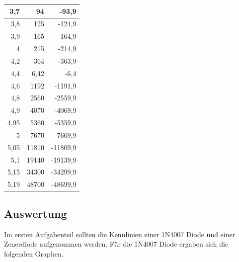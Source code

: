 \documentclass[12pt,a4paper]{article}
\begin{document}
\begin{table}[H]
\begin{center}
\begin{tabular}{|r|r|r|}
3,7 & 94 & -93,9 \\ \hline
3,8 & 125 & -124,9 \\ \hline
3,9 & 165 & -164,9 \\ \hline
4 & 215 & -214,9 \\ \hline
4,2 & 364 & -363,9 \\ \hline
4,4 & 6,42 & -6,4 \\ \hline
4,6 & 1192 & -1191,9 \\ \hline
4,8 & 2560 & -2559,9 \\ \hline
4,9 & 4070 & -4069,9 \\ \hline
4,95 & 5360 & -5359,9 \\ \hline
5 & 7670 & -7669,9 \\ \hline
5,05 & 11810 & -11809,9 \\ \hline
5,1 & 19140 & -19139,9 \\ \hline
5,15 & 34300 & -34299,9 \\ \hline
5,19 & 48700 & -48699,9 \\ \hline
\end{tabular}
\end{center}
\label{tab:a2_2}
\end{table}



\subsection{Auswertung}

Im ersten Aufgabenteil sollten die Kennlinien einer 1N4007 Diode und einer Zenerdiode aufgenommen werden. Für die 1N4007 Diode ergaben sich die folgenden Graphen.
\end{document}
